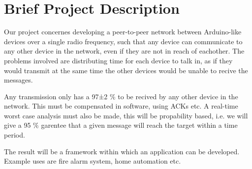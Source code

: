 \chapter{Brief Project Description}
Our project concernes developing a peer-to-peer network between Arduino-like devices over a single radio frequency, such that any device can communicate to any other device in the network, even if they are not in reach of eachother.
The problems involved are distributing time for each device to talk in, as if they would transmit at the same time the other devices would be unable to recive the messages.

Any transmission only has a 97±2 \% to be recived by any other device in the network.
This must be compensated in software, using ACKs etc.
A real-time worst case analysis must also be made, this will be propability based, i.e. we will give a 95 \% garentee that a given message will reach the target within a time period.

The result will be a framework within which an application can be developed.
Example uses are fire alarm system, home automation etc.
 